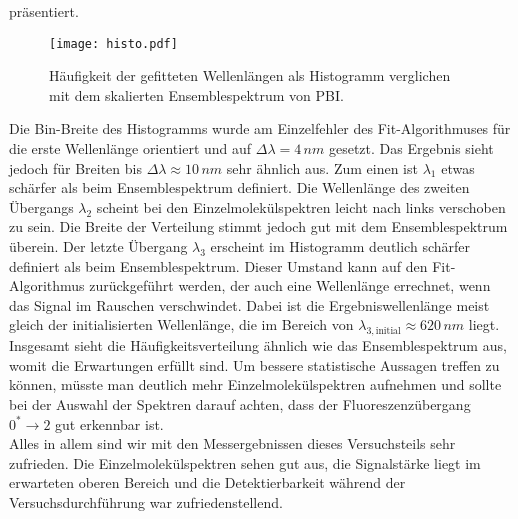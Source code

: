 präsentiert.
\begin{figure}[h!]
    \centering
    \texttt{[image: histo.pdf]}
    \caption{\label{fig:histo}Häufigkeit der gefitteten Wellenlängen als Histogramm verglichen mit dem skalierten 
    Ensemblespektrum von PBI.}
\end{figure}\FloatBarrier
Die Bin-Breite des Histogramms wurde am Einzelfehler des Fit-Algorithmuses für die erste Wellenlänge orientiert und auf 
$\Delta{\lambda} = 4\,\si{nm}$ gesetzt. Das Ergebnis sieht jedoch für Breiten bis $\Delta{\lambda} \approx 10\,\si{nm}$
sehr ähnlich aus. 
Zum einen ist $\lambda_{1}$ etwas schärfer als beim Ensemblespektrum definiert. Die Wellenlänge des zweiten Übergangs 
$\lambda_{2}$ scheint bei den Einzelmolekülspektren leicht nach links verschoben zu sein. Die Breite der Verteilung stimmt 
jedoch gut mit dem Ensemblespektrum überein. 
Der letzte Übergang $\lambda_{3}$ erscheint im Histogramm deutlich schärfer definiert als beim Ensemblespektrum. 
Dieser Umstand kann auf den Fit-Algorithmus zurückgeführt werden, der auch eine Wellenlänge errechnet, wenn das Signal im 
Rauschen verschwindet. Dabei ist die Ergebniswellenlänge meist gleich der initialisierten Wellenlänge, die im Bereich 
von $\lambda_{3, \text{initial}} \approx 620\,\si{nm}$ liegt. Insgesamt sieht die Häufigkeitsverteilung ähnlich wie das 
Ensemblespektrum aus, womit die Erwartungen erfüllt sind. Um bessere statistische Aussagen treffen zu können, müsste man 
deutlich mehr Einzelmolekülspektren aufnehmen und sollte bei der Auswahl der Spektren darauf achten, dass der 
Fluoreszenzübergang $0^{*}\rightarrow2$ gut erkennbar ist. \\
Alles in allem sind wir mit den Messergebnissen dieses Versuchsteils sehr zufrieden. Die Einzelmolekülspektren sehen 
gut aus, die Signalstärke liegt im erwarteten oberen Bereich und die Detektierbarkeit während der Versuchsdurchführung 
war zufriedenstellend. \\ 








